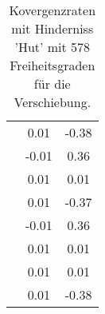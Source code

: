 \begin{table}
\begin{tabular}{c|cc|}
\multicolumn{1}{|c|}{} & \multicolumn{1}{|c|}{      0.01} & \multicolumn{1}{|c|}{     -0.38} \\ 
\multicolumn{1}{|c|}{} & \multicolumn{1}{|c|}{     -0.01} & \multicolumn{1}{|c|}{      0.36} \\ 
\multicolumn{1}{|c|}{} & \multicolumn{1}{|c|}{      0.01} & \multicolumn{1}{|c|}{      0.01} \\ 
\multicolumn{1}{|c|}{} & \multicolumn{1}{|c|}{      0.01} & \multicolumn{1}{|c|}{     -0.37} \\ 
\multicolumn{1}{|c|}{} & \multicolumn{1}{|c|}{     -0.01} & \multicolumn{1}{|c|}{      0.36} \\ 
\multicolumn{1}{|c|}{} & \multicolumn{1}{|c|}{      0.01} & \multicolumn{1}{|c|}{      0.01} \\ 
\multicolumn{1}{|c|}{} & \multicolumn{1}{|c|}{      0.01} & \multicolumn{1}{|c|}{      0.01} \\ 
\multicolumn{1}{|c|}{} & \multicolumn{1}{|c|}{      0.01} & \multicolumn{1}{|c|}{     -0.38} \\ 
\hline 
\end{tabular}\caption{Kovergenzraten mit Hinderniss 'Hut' mit 578 Freiheitsgraden für die Verschiebung.}\label{tab:Rate_Hut_level3}
\end{table} 
